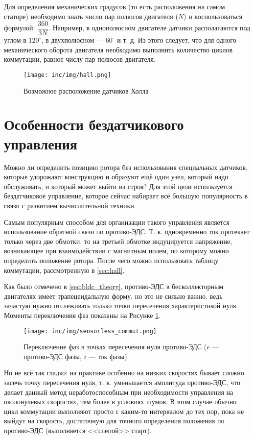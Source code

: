 Для определения механических градусов (то есть расположения на самом статоре) необходимо знать число пар полюсов двигателя ($N$) и воспользоваться формулой: $\dfrac{360}{3N}$. Например, в однополюсном двигателе датчики располагаются под углом в $120^{\circ}$, в двухполюсном --- $60^{\circ}$ и т. д. Из этого следует, что для одного механического оборота двигателя необходимо выполнить количество циклов коммутации, равное числу пар полюсов двигателя.

\begin{figure}[!h]
\centering
\texttt{[image: inc/img/hall.png]}
\caption{Возможное расположение датчиков Холла}
\end{figure}

\section{Особенности бездатчикового управления}
\label{sec:sensorless_ways}

Можно ли определить позицию ротора без использования специальных датчиков, которые удорожают конструкцию и образуют ещё один узел, который надо обслуживать, и который может выйти из строя? Для этой цели используется бездатчиковое управление, которое сейчас набирает всё большую популярность в связи с развитием вычислительной техники.

Самым популярным способом для организации такого управления является использование обратной связи по противо-ЭДС. Т. к. одновременно ток протекает только через две обмотки, то на третьей обмотке индуцируется напряжение, возникающее при взаимодействии с магнитным полем, по которому можно определить положение ротора. После чего можно использовать таблицу коммутации, рассмотренную в \ref{sec:hall}.

Как было отмечено в \ref{sec:bldc_theory}, противо-ЭДС в бесколлекторным двигателях имеет трапецеидальную форму, но это не сильно важно, ведь зачастую нужно отслеживать только точки пересечения характеристикой нуля. Моменты переключения фаз показаны на Рисунке \ref{pic:sensorless_commut}.

\begin{figure}[!h]
\centering
\texttt{[image: inc/img/sensorless\_commut.png]}
\caption{Переключение фаз в точках пересечения нуля противо-ЭДС ($e$ --- противо-ЭДС фазы, $i$ --- ток фазы)}
\label{pic:sensorless_commut}
\end{figure}
\clearpage

Но не всё так гладко: на практике особенно на низких скоростях бывает сложно засечь точку пересечения нуля, т. к. уменьшается амплитуда противо-ЭДС, что делает данный метод неработоспособным при необходимости управления на околонулевых скоростях, тем более в условиях шумов. В этом случае обычно цикл коммутации выполняют просто с каким-то интервалом до тех пор, пока не выйдут на скорость, достаточную для точного определения положения по противо-ЭДС (выполняется <<слепой>> старт).

